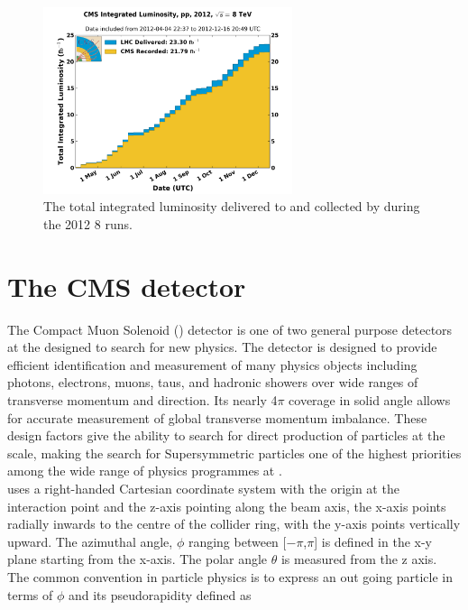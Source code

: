 \begin{figure}[!h]

\centering
\includegraphics[width=0.65\textwidth]{plots/lhc-lumo-8tev.png}
\caption[The total integrated luminosity delivered to and collected by \CMS during the 2012 8 \TeV \pp runs]{The total integrated luminosity delivered to and collected by \CMS during the 2012 8 \TeV \pp runs.}  
\label{fig:lhc-ring}
\end{figure}


\section{The CMS detector}
\label{sec:cmsdetector}

The Compact Muon Solenoid (\CMS) detector is one of two general purpose detectors at the \LHC designed to search for new physics. The detector is designed to provide efficient identification and measurement of many physics objects including photons, electrons, muons, taus, and hadronic showers over wide ranges of transverse momentum and direction. Its nearly 4$\pi$ coverage in solid angle allows for accurate measurement of global transverse momentum imbalance. These design factors give \CMS the ability to search for direct production of \SUSY particles at the \TeV scale, making the search for Supersymmetric particles one of the highest priorities among the wide range of physics programmes at \CMS. \\

\CMS uses a right-handed Cartesian coordinate system with the origin at the interaction point and the z-axis pointing along the beam axis, the x-axis points radially inwards to the centre of the collider ring, with the y-axis points vertically upward. The azimuthal angle, $\phi$ ranging between [$-\pi$,$\pi$] is defined in the x-y plane starting from the x-axis. The polar angle $\theta$ is measured from the z axis. The common convention in particle physics is to express an out going particle in terms of $\phi$ and its pseudorapidity defined as

